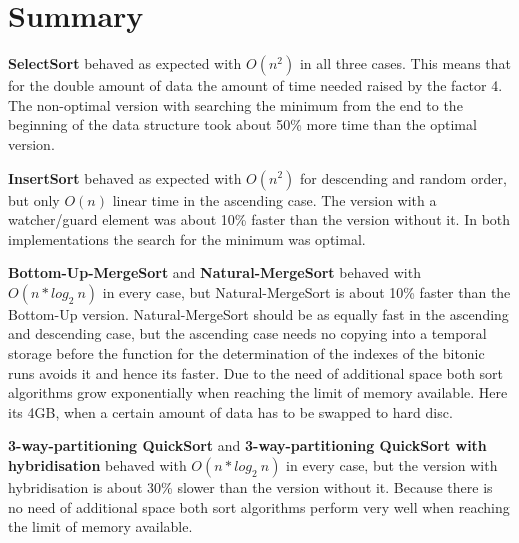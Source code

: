 \documentclass[11pt]{amsart}
\begin{document}
\newpage
\section{Summary}
%
%
\textbf{SelectSort} behaved as expected with $O(n^2)$ in all three cases. This means that for the double amount of data the amount of time needed raised by the factor 4. The non-optimal version with searching the minimum from the end to the beginning of the data structure took about 50\% more time than the optimal version.

\textbf{InsertSort} behaved as expected with $O(n^2)$ for descending and random order, but only $O(n)$ linear time in the ascending case. The version with a watcher/guard element was about 10\% faster than the version without it. In both implementations the search for the minimum was optimal.

\textbf{Bottom-Up-MergeSort} and \textbf{Natural-MergeSort}  behaved with $O(n*log_2~n)$ in every case, but Natural-MergeSort is about 10\% faster than the Bottom-Up version. Natural-MergeSort should be as equally fast in the ascending and descending case, but the ascending case needs no copying into a temporal storage before the function for the determination of the indexes of the bitonic runs avoids it and hence its faster. Due to the need of additional space both sort algorithms grow exponentially when reaching the limit of memory available. Here its 4GB, when a certain amount of data has to be swapped to hard disc.

\textbf{3-way-partitioning QuickSort} and \textbf{3-way-partitioning QuickSort with hybridisation} behaved with $O(n*log_2~n)$ in every case, but the version with hybridisation is about 30\% slower than the version without it. Because there is no need of additional space both sort algorithms perform very well when reaching the limit of memory available.
\end{document}
